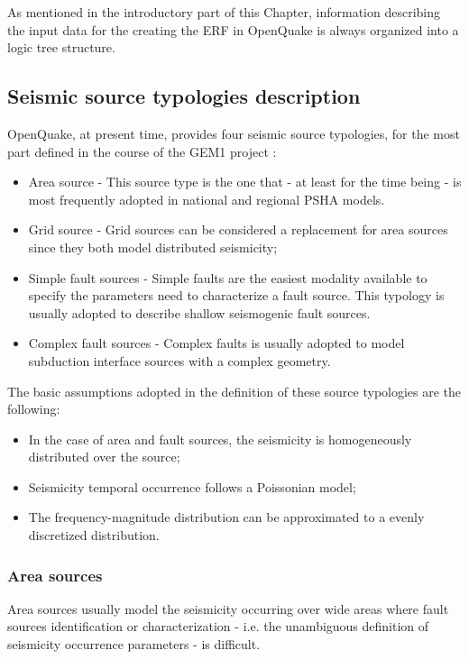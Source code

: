 As mentioned in the introductory part of this Chapter, information describing 
the input data for the creating the ERF in OpenQuake is always organized into 
a logic tree structure.
%
\subsection{Seismic source typologies description}
\label{hazard:seismic_source_types}
%
OpenQuake, at present time, provides four seismic source typologies, for the 
most part defined in the course of the GEM1 project \citep{pagani2010}:
\begin{itemize}
\item Area source - This source type is the one that - at least for the time 
being - is most frequently adopted in national and regional PSHA models.
\item Grid source - Grid sources can be considered a replacement for area 
sources since they both model distributed seismicity;
\item Simple fault sources - Simple faults are the easiest modality available
to specify the parameters need to characterize a fault source. This typology
is usually adopted to describe shallow seismogenic fault sources.
\item Complex fault sources - Complex faults is usually adopted to model
subduction interface sources with a complex geometry. 
\end{itemize}

The basic assumptions adopted in the definition of these source typologies 
are the following:
\begin{itemize}
\item In the case of area and fault sources, the seismicity is homogeneously 
distributed over the source; 
\item Seismicity temporal occurrence follows a Poissonian model; 
\item The frequency-magnitude distribution can be approximated to a evenly 
discretized distribution. 
\end{itemize}
%
\subsubsection{Area sources}
\label{hazard:seismic_source_types:areaSources}
Area sources usually model the seismicity occurring over wide areas where fault 
sources identification or characterization - i.e. the unambiguous definition 
of seismicity occurrence parameters - is difficult. 


